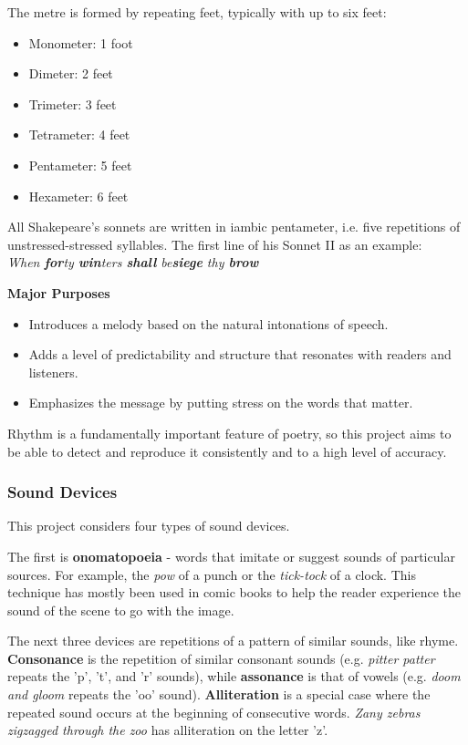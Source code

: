 The metre is formed by repeating feet, typically with up to six feet:
\begin{itemize}
\setlength{\itemsep}{0pt}
\item{Monometer: 1 foot}
\item{Dimeter: 2 feet}
\item{Trimeter: 3 feet}
\item{Tetrameter: 4 feet}
\item{Pentameter: 5 feet}
\item{Hexameter: 6 feet}
\end{itemize}

All Shakepeare's sonnets are written in iambic pentameter, i.e. five repetitions of unstressed-stressed syllables. The first line of his Sonnet II as an example:\\
\textit{When \textbf{for}ty \textbf{win}ters \textbf{shall} be\textbf{siege} thy \textbf{brow}}

\textbf{Major Purposes}
\begin{itemize}
\item{Introduces a melody based on the natural intonations of speech.} 
\item{Adds a level of predictability and structure that resonates with readers and listeners.}
\item{Emphasizes the message by putting stress on the words that matter.}
\end{itemize}

Rhythm is a fundamentally important feature of poetry, so this project aims to be able to detect and reproduce it consistently and to a high level of accuracy.

\subsubsection{Sound Devices}
\label{sec:sound}
This project considers four types of sound devices.

The first is \textbf{onomatopoeia} - words that imitate or suggest sounds of particular sources. For example, the \textit{pow} of a punch or the \textit{tick-tock} of a clock. This technique has mostly been used in comic books to help the reader experience the sound of the scene to go with the image.

The next three devices are repetitions of a pattern of similar sounds, like rhyme. \textbf{Consonance} is the repetition of similar consonant sounds (e.g. \textit{pitter patter} repeats the 'p', 't', and 'r' sounds), while \textbf{assonance} is that of vowels (e.g. \textit{doom and gloom} repeats the 'oo' sound). \textbf{Alliteration} is a special case where the repeated sound occurs at the beginning of consecutive words. \textit{Zany zebras zigzagged through the zoo} has alliteration on the letter 'z'.


